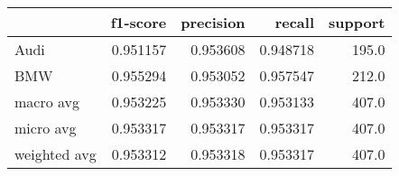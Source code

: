 \begin{tabular}{lrrrr}
\toprule
{} &  f1-score &  precision &    recall &  support \\
\midrule
Audi         &  0.951157 &   0.953608 &  0.948718 &    195.0 \\
BMW          &  0.955294 &   0.953052 &  0.957547 &    212.0 \\
macro avg    &  0.953225 &   0.953330 &  0.953133 &    407.0 \\
micro avg    &  0.953317 &   0.953317 &  0.953317 &    407.0 \\
weighted avg &  0.953312 &   0.953318 &  0.953317 &    407.0 \\
\bottomrule
\end{tabular}
